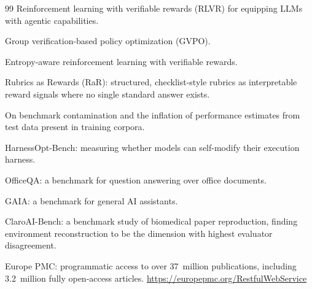 \begin{thebibliography}{99}
Reinforcement learning with verifiable rewards (RLVR) for equipping LLMs with
agentic capabilities.

Group verification-based policy optimization (GVPO).

Entropy-aware reinforcement learning with verifiable rewards.

Rubrics as Rewards (RaR): structured, checklist-style rubrics as interpretable
reward signals where no single standard answer exists.

On benchmark contamination and the inflation of performance estimates from
test data present in training corpora.

HarnessOpt-Bench: measuring whether models can self-modify their execution
harness.

OfficeQA: a benchmark for question answering over office documents.

GAIA: a benchmark for general AI assistants.

ClaroAI-Bench: a benchmark study of biomedical paper reproduction, finding
environment reconstruction to be the dimension with highest evaluator
disagreement.

Europe PMC: programmatic access to over 37~million publications, including
3.2~million fully open-access articles.
\url{https://europepmc.org/RestfulWebService}

\end{thebibliography}
